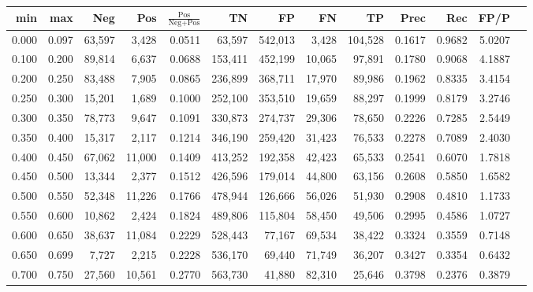 \begin{tabular}{rrrrrrrrrrrrr}
\toprule
  min &   max &    Neg &    Pos & $\frac{\text{Pos}}{\text{Neg}+\text{Pos}}$ &      TN &      FP &      FN &      TP &   Prec &    Rec &   FP/P \\
\midrule
0.000 & 0.097 & 63,597 &  3,428 &                                     0.0511 &  63,597 & 542,013 &   3,428 & 104,528 & 0.1617 & 0.9682 & 5.0207 \\
0.100 & 0.200 & 89,814 &  6,637 &                                     0.0688 & 153,411 & 452,199 &  10,065 &  97,891 & 0.1780 & 0.9068 & 4.1887 \\
0.200 & 0.250 & 83,488 &  7,905 &                                     0.0865 & 236,899 & 368,711 &  17,970 &  89,986 & 0.1962 & 0.8335 & 3.4154 \\
0.250 & 0.300 & 15,201 &  1,689 &                                     0.1000 & 252,100 & 353,510 &  19,659 &  88,297 & 0.1999 & 0.8179 & 3.2746 \\
0.300 & 0.350 & 78,773 &  9,647 &                                     0.1091 & 330,873 & 274,737 &  29,306 &  78,650 & 0.2226 & 0.7285 & 2.5449 \\
0.350 & 0.400 & 15,317 &  2,117 &                                     0.1214 & 346,190 & 259,420 &  31,423 &  76,533 & 0.2278 & 0.7089 & 2.4030 \\
0.400 & 0.450 & 67,062 & 11,000 &                                     0.1409 & 413,252 & 192,358 &  42,423 &  65,533 & 0.2541 & 0.6070 & 1.7818 \\
0.450 & 0.500 & 13,344 &  2,377 &                                     0.1512 & 426,596 & 179,014 &  44,800 &  63,156 & 0.2608 & 0.5850 & 1.6582 \\
0.500 & 0.550 & 52,348 & 11,226 &                                     0.1766 & 478,944 & 126,666 &  56,026 &  51,930 & 0.2908 & 0.4810 & 1.1733 \\
0.550 & 0.600 & 10,862 &  2,424 &                                     0.1824 & 489,806 & 115,804 &  58,450 &  49,506 & 0.2995 & 0.4586 & 1.0727 \\
0.600 & 0.650 & 38,637 & 11,084 &                                     0.2229 & 528,443 &  77,167 &  69,534 &  38,422 & 0.3324 & 0.3559 & 0.7148 \\
0.650 & 0.699 &  7,727 &  2,215 &                                     0.2228 & 536,170 &  69,440 &  71,749 &  36,207 & 0.3427 & 0.3354 & 0.6432 \\
0.700 & 0.750 & 27,560 & 10,561 &                                     0.2770 & 563,730 &  41,880 &  82,310 &  25,646 & 0.3798 & 0.2376 & 0.3879 \\

\end{tabular}
